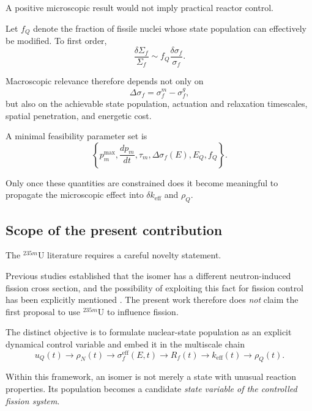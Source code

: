 A positive microscopic result would not imply practical reactor control.

Let $f_Q$ denote the fraction of fissile nuclei whose state population can effectively be modified. To first order,
\begin{equation}
\frac{\delta\Sigma_f}{\Sigma_f}
\sim
f_Q
\frac{\delta\sigma_f}{\sigma_f}.
\end{equation}

Macroscopic relevance therefore depends not only on
\begin{equation}
\Delta\sigma_f
=
\sigma_f^m-\sigma_f^g,
\end{equation}
but also on the achievable state population, actuation and relaxation timescales, spatial penetration, and energetic cost.

A minimal feasibility parameter set is
\begin{equation}
\boxed{
\left\{
p_m^{\max},
\frac{dp_m}{dt},
\tau_m,
\Delta\sigma_f(E),
E_Q,
f_Q
\right\}
}.
\end{equation}

Only once these quantities are constrained does it become meaningful to propagate the microscopic effect into $\delta k_{\mathrm{eff}}$ and $\rho_Q$.

\subsection{Scope of the present contribution}

The $^{235m}$U literature requires a careful novelty statement.

Previous studies established that the isomer has a different neutron-induced fission cross section, and the possibility of exploiting this fact for fission control has been explicitly mentioned \cite{DEer1988,LiuWang2022}. The present work therefore does \emph{not} claim the first proposal to use $^{235m}$U to influence fission.

The distinct objective is to formulate nuclear-state population as an explicit dynamical control variable and embed it in the multiscale chain
\begin{equation}
u_Q(t)
\rightarrow
\rho_N(t)
\rightarrow
\sigma_f^{\mathrm{eff}}(E,t)
\rightarrow
R_f(t)
\rightarrow
k_{\mathrm{eff}}(t)
\rightarrow
\rho_Q(t).
\label{eq:multiscale_chain}
\end{equation}

Within this framework, an isomer is not merely a state with unusual reaction properties. Its population becomes a candidate \emph{state variable of the controlled fission system}.


